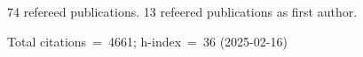 74 refereed publications. 13 refeered publications as first author.

Total citations~=~4661; h-index~=~36 (2025-02-16)